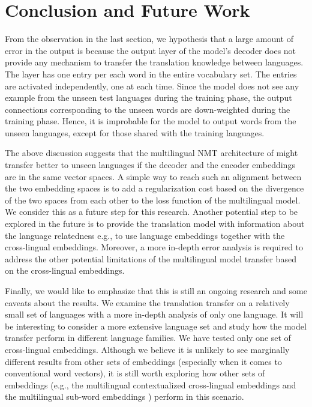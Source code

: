 \documentclass[thesis,fonts=libertine]{cluu}
\begin{document}
\chapter{Conclusion and Future Work}
\label{chap:conclusion}

From the observation in the last section, we hypothesis that a large amount of error in the output is because the output layer of the model's decoder does not provide any mechanism to transfer the translation knowledge between languages. The layer has one entry per each word in the entire vocabulary set. The entries are activated independently, one at each time. Since the model does not see any example from the unseen test languages during the training phase, the output connections corresponding to the unseen words are down-weighted during the training phase. Hence, it is improbable for the model to output words from the unseen languages, except for those shared with the training languages.

The above discussion suggests that the multilingual NMT architecture of \cite{Johnson:2016aa} might transfer better to unseen languages if the decoder and the encoder embeddings are in the same vector spaces. A simple way to reach such an alignment between the two embedding spaces is to add a regularization cost based on the divergence of the two spaces from each other to the loss function of the multilingual model. We consider this as a future step for this research. Another potential step to be explored in the future is to provide the translation model with information about the language relatedness e.g., to use language embeddings \parencite{littell-etal-2017-uriel} together with the cross-lingual embeddings. Moreover, a more in-depth error analysis is required to address the other potential limitations of the multilingual model transfer based on the cross-lingual embeddings. 

Finally, we would like to emphasize that this is still an ongoing research and some caveats about the results. We examine the translation transfer on a relatively small set of languages with a more in-depth analysis of only one language. It will be interesting to consider a more extensive language set and study how the model transfer perform in different language families. We have tested only one set of cross-lingual embeddings. Although we believe it is unlikely to see marginally different results from other sets of embeddings (especially when it comes to conventional word vectors), it is still worth exploring how other sets of embeddings (e.g., the multilingual contextualized cross-lingual embeddings \cite{devlin-etal-2019-bert} and the multilingual sub-word embeddings \cite{Heinzerling:2017aa}) perform in this scenario. 
\end{document}
